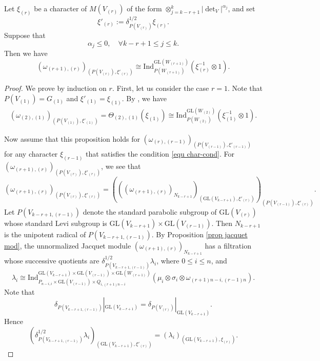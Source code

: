 \documentclass[11pt,reqno]{amsart}
\renewcommand{\1}{{\mathbf{1}}} \newcommand{\sB}{{\mathscr{B}}}
\newcommand{\GL}{{\mathrm{GL}}}\newcommand{\G}{{\mathrm{G}}}
\newcommand{\Ind}{{\mathrm{Ind}}} \newcommand{\ind}{{\mathrm{ind}}}
\theoremstyle{plain}
\theoremstyle{definition}
\numberwithin{equation}{section}
\begin{document}
\begin{prop}\label{key prop2}
Let $\xi_{(r)}$ be a character of $M(V_{(r)})$ of the form $\otimes_{j=k-r+1}^k|\det\nolimits_V|^{\alpha_j}$, and set $$\xi'_{(r)}:=\delta^{1/2}_{P(V_{(r)})}\xi_{(r)}.$$ Suppose that
\begin{equation}\label{equ char-cond}\alpha_j\leq0,\quad\forall k-r+1\leq j\leq k.\end{equation} Then we have
$$\left(\omega_{(r+1),(r)}\right)_{\left(P(V_{(r)}),\xi'_{(r)}\right)}\cong\Ind^{\GL(W_{(r+1)})}_{P(W_{(r+1)})}\left(\xi^{-1}_{(r)}\otimes1\right).$$
\end{prop}
\begin{proof}
We prove by induction on $r$.  First, let us consider the case $r=1$. Note that $P(V_{(1)})=G_{(1)}$ and $\xi'_{(1)}=\xi_{(1)}$.
By \cite[Theorem 1.4]{chen}, we have
$$\begin{aligned}\left(\omega_{(2),(1)}\right)_{\left(P(V_{(1)}),\xi'_{(1)}\right)}=\Theta_{(2),(1)}\left(\xi_{(1)}\right)
\cong\Ind^{\GL(W_{(2)})}_{P(W_{(2)})}\left(\xi_{(1)}^{-1}\otimes 1\right).
\end{aligned}$$ 

Now assume that this proposition holds for $\left(\omega_{(r),(r-1)}\right)_{\left(P(V_{(r-1)}),\xi'_{(r-1)}\right)}$ for any character 
$\xi_{(r-1)}$ that satisfies the condition \eqref{equ char-cond}.
For $\left(\omega_{(r+1),(r)}\right)_{\left(P(V_{(r)}),\xi'_{(r)}\right)}$, we see that
$$\left(\omega_{(r+1),(r)}\right)_{\left(P(V_{(r)}),\xi'_{(r)}\right)}=\left(\left(\left(\omega_{(r+1),(r)}\right)_{N_{k-r+1}} \right)_{\left(\GL(V_{k-r+1}),\xi'_{(r)}\right)}\right)_{\left(P(V_{(r-1)}),\xi'_{(r)}\right)}.$$
Let $P(V_{k-r+1,(r-1)})$ denote the standard parabolic subgroup of $\GL(V_{(r)})$ whose standard Levi subgroup is $\GL(V_{k-r+1})\times\GL(V_{(r-1)})$. Then $N_{k-r+1}$ is the unipotent radical of $P(V_{k-r+1,(r-1)})$.
By Proposition \ref{prop jacquet mod}, the unnormalized Jacquet module $\left(\omega_{(r+1),(r)}\right)_{N_{k-r+1}}$ has a filtration whose successive quotients are $\delta^{1/2}_{P(V_{k-r+1,(r-1)})}\lambda_i$, where $0\leq i\leq n$, and
$$\lambda_i\cong\Ind_{P_{n-i,i}\times \GL(V_{(r-1)})\times Q_{i,(r+1)n-i}}^{\GL(V_{k-r+1})\times\GL(V_{(r-1)})\times\GL(W_{(r+1)})}\left(\mu_i\otimes\sigma_i\otimes\omega_{(r+1)n-i,(r-1)n}\right).$$ 
Note that
$$\delta_{P(V_{k-r+1,(r-1)})}|_{\GL(V_{k-r+1})}=\delta_{P(V_{(r)})}|_{\GL(V_{k-r+1})}.$$
Hence
$$\left(\delta^{1/2}_{P(V_{k-r+1,(r-1)})}\lambda_i \right)_{\left(\GL(V_{k-r+1}),\xi'_{(r)}\right)}=\left(\lambda_i \right)_{\left(\GL(V_{k-r+1}),\xi_{(r)}\right)}.
$$


\end{proof}
\end{document}
